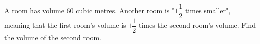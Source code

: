 A room has volume $60$ cubic metres. Another room is "$1\dfrac{1}{2}$ times smaller", meaning that the first room's volume is $1\dfrac{1}{2}$ times the second room's volume. Find the volume of the second room.
